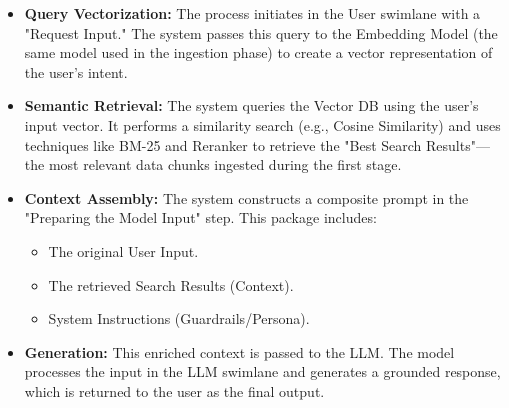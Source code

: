 \begin{itemize}

    \item \textbf{Query Vectorization:} The process initiates in the User swimlane with a "Request Input." The system passes this query to the Embedding Model (the same model used in the ingestion phase) to create a vector representation of the user's intent.

    \item \textbf{Semantic Retrieval:} The system queries the Vector DB using the user's input vector. It performs a similarity search (e.g., Cosine Similarity) and uses techniques like BM-25 and Reranker to retrieve the "Best Search Results"—the most relevant data chunks ingested during the first stage.
    
    \item \textbf{Context Assembly:} The system constructs a composite prompt in the "Preparing the Model Input" step. This package includes:
    
    \begin{itemize}
        
        \item The original User Input.
        
        \item The retrieved Search Results (Context).
        
        \item System Instructions (Guardrails/Persona).
    
    \end{itemize}
    
    \item \textbf{Generation:} This enriched context is passed to the LLM. The model processes the input in the LLM swimlane and generates a grounded response, which is returned to the user as the final output.
    
\end{itemize}




